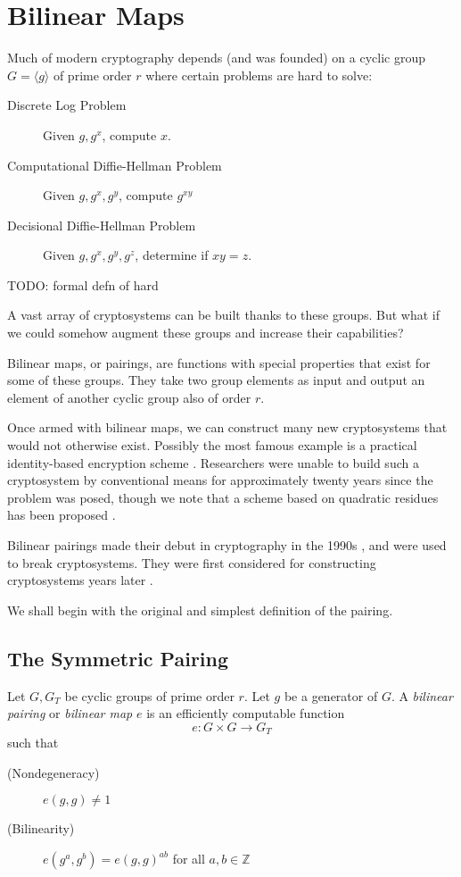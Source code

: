 \chapter{Bilinear Maps}

Much of modern cryptography depends (and was founded\cite{diffie76new})
on a cyclic group $G = \langle g \rangle$ of prime order $r$ where certain
problems are hard to solve:

\begin{description}
\item [Discrete Log Problem]
Given $g, g^x$, compute $x$.
\item [Computational Diffie-Hellman Problem]
Given $g, g^x, g^y$, compute $g^{x y}$
\item [Decisional Diffie-Hellman Problem]
Given $g, g^x, g^y, g^z$, determine if $x y = z$.
\end{description}

TODO: formal defn of hard

A vast array of cryptosystems can be built thanks to these groups. 
But what if we could somehow augment these groups and increase their
capabilities?

Bilinear maps, or pairings, are functions with special
properties that exist for some of these groups.
They take two group elements as input and output an element of another cyclic
group also of order $r$.

Once armed with bilinear maps, we can construct many new cryptosystems
that would not otherwise exist. Possibly the most famous example is a
practical identity-based encryption scheme \cite{bf}.
Researchers were unable to build such a cryptosystem by
conventional means for approximately
twenty years since the problem was posed, though we note that a
scheme based on quadratic residues has been proposed \cite{cocks01}.

Bilinear pairings made their debut in cryptography in the 1990s \cite{mov,fr,fmr},
and were used to break cryptosystems. They were first considered for
constructing cryptosystems years later \cite{sok}.

We shall begin with the original and simplest definition of the pairing.

\section{The Symmetric Pairing}

Let $G, G_T$ be cyclic groups of prime order $r$.
Let $g$ be a generator of $G$.
A \emph{bilinear pairing} or \emph{bilinear map}
$e$ is an efficiently computable function
\[
e:G \times G \rightarrow G_T
\]
such that
\begin{description}
\item [(Nondegeneracy)]
$e(g,g) \ne 1$
\item [(Bilinearity)]
$e(g^a, g^b) = e(g,g)^{a b}$ for all $a, b \in \mathbb{Z}$
\end{description}

